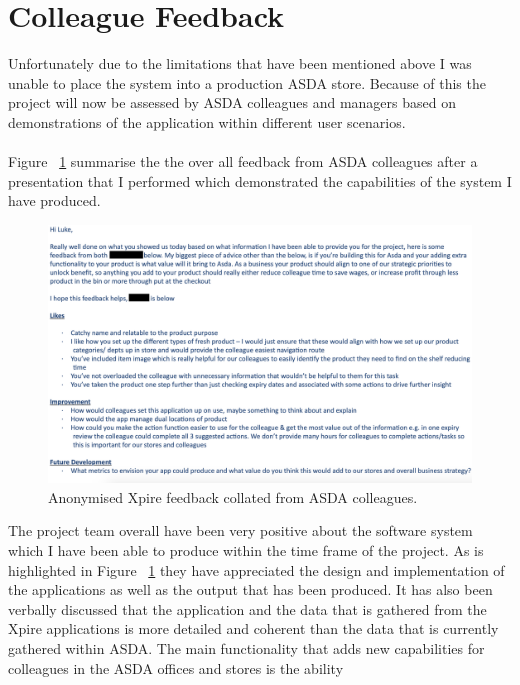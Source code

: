\documentclass[a4paper,11pt]{report}
\begin{document}
\section{Colleague Feedback}
Unfortunately due to the limitations that have been mentioned above I was unable to place the system into a production ASDA store.
Because of this the project will now be assessed by ASDA colleagues and managers based on demonstrations of the application within different user scenarios. 
\\
\\
Figure ~\ref{fig:feedback} summarise the the over all feedback from ASDA colleagues after a presentation that I performed which demonstrated the capabilities of the system I have produced.


\begin{figure}[H]
    \centering
    \includegraphics[width=15cm]{./assets/images/feedback.png}
    \caption{Anonymised Xpire feedback collated from ASDA colleagues.}
    \label{fig:feedback}
\end{figure}
The project team overall have been very positive about the software system which I have been able to produce within the time frame of the project. 
As is highlighted in Figure ~\ref{fig:feedback} they have appreciated the design and implementation of the applications as well as the output that has been produced.
It has also been verbally discussed that the application and the data that is gathered from the Xpire applications is more detailed and coherent than the 
data that is currently gathered within ASDA. The main functionality that adds new capabilities for colleagues in the ASDA offices and stores is the ability
\end{document}
